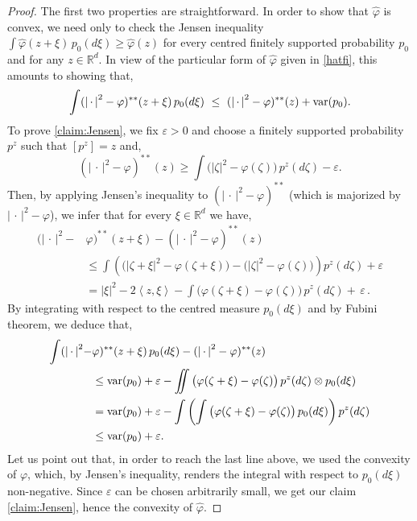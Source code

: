 \documentclass[11pt,letterpaper,reqno]{amsart}
\theoremstyle{definition}
\numberwithin{equation}{section}
\newcommand{\e}{\varepsilon}
\def\f{\varphi}
\newcommand{\R}{\mathbb{R}}
\newcommand{\Rd}{\R^d}
\newcommand{\var}{{\rm{var}}}
\newcommand{\argu}{{\,\cdot\,}}
\newcommand{\pairing}[1]{{\left \langle #1 \right \rangle}}
\newcommand{\abs}[1]{{\left \lvert #1 \right \rvert}}
\newcommand{\eps}{\varepsilon}
\begin{document}
{\begin{proof} The first two properties are straightforward.  In order to show that $\hat \f$ is convex, we need only to check the Jensen inequality $ \int \hat \f(z+\xi) \,p_0(d\xi) \ge  \hat \f(z)$ for every centred  finitely supported
	probability  $p_0$ and for any $z\in\R^d$. In view of the particular form of $\hat \f$ given in \eqref{hatfi}, this amounts to showing that,
	\begin{equation}\label{claim:Jensen}
		\int (\abs{\argu}^2-\varphi)^{**}(z+\xi)\, p_0(d\xi)\ \le\ (\abs{\argu}^2-\varphi)^{**}(z)  + \var(p_0).
	\end{equation}
	To prove \eqref{claim:Jensen}, we fix $\e>0$ and  choose a finitely supported probability $p^z$ such that $[p^z] = z$ and, $$ (\abs{\argu}^2-\varphi)^{**}(z) \geq \int \big( \abs{\zeta}^2 - \varphi(\zeta) \big) \, p^z(d\zeta) - \eps . $$
	Then, by applying  Jensen's inequality to  $(\abs{\argu}^2-\varphi)^{**}$ (which is majorized by $\abs{\argu}^2-\varphi$), we infer that for every $\xi\in \Rd$ we have,
	\begin{align*}\label{epsbound}
		(\abs{\argu}^2-&\varphi)^{**}(z+\xi)- (\abs{\argu}^2-\varphi)^{**}(z) \\
		&\leq 
		\int   \left( \big( \abs{\zeta+\xi}^2 - \varphi(\zeta+\xi) \big)-  \big( \abs{\zeta}^2 - \varphi(\zeta) \big)\right)  p^z(d\zeta)+\eps \\
		&=  \abs{\xi}^2 - 2 \pairing{z,\xi} - \int \big(\varphi(\zeta+\xi) - \varphi(\zeta)\big)\, p^z(d\zeta) + \,\eps\,  .
	\end{align*}
	By integrating  with respect to the centred measure $p_0(d\xi)$ and by  Fubini theorem, we deduce that,
	\begin{align*}
		\int (\abs{\argu}^2-&\varphi)^{**}(z+\xi)\, p_0(d\xi) -  (\abs{\argu}^2-\varphi)^{**}(z)\\
		& \leq \var(p_0) + \eps  - \iint \big(\varphi(\zeta+\xi) - \varphi(\zeta)\big)\, p^z(d\zeta) \otimes p_0(d\xi)  \\
		& =  \var(p_0) + \eps - \int \left(\int \big(\varphi(\zeta+\xi) - \varphi(\zeta)\big)\,p_0(d\xi)\right)   p^z(d\zeta) \\
		& \le  \var(p_0)  + \eps .
	\end{align*}
	Let us point out that, in order to reach  the last line above, we used  the convexity of  $\varphi$, which, by Jensen's inequality,  renders the integral with respect to $p_0(d\xi)$ non-negative. Since $\eps$ can be chosen arbitrarily small, we get our claim \eqref{claim:Jensen}, hence the convexity of $\hat \f$.  
	

\end{proof}}
\end{document}
